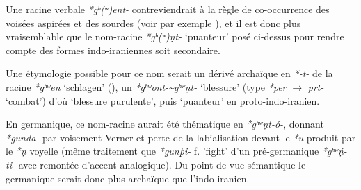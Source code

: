 \documentclass[11pt]{article}
\newcommand{\ipa}[1]{{\phon\textit{#1}}}
\begin{document}
Une racine verbale \ipa{*gʰ(ʷ)ent-} contreviendrait à la règle de co-occurrence des voisées aspirées et des sourdes (voir par exemple \citealt{kuemmel12pie}), et il est donc plus vraisemblable que le nom-racine \ipa{*gʰ(ʷ)ṇt-} `puanteur' posé ci-dessus pour rendre compte des formes indo-iraniennes soit secondaire.

Une étymologie possible pour ce nom serait un dérivé  archaïque en \ipa{*-t-} de la racine \ipa{*gʰʷen} `schlagen' (\citealt[218]{liv}), un \ipa{*gʰʷont-\textasciitilde *gʰʷṇt-} `blessure' (type \ipa{*per} $\rightarrow$ \ipa{pṛt-} `combat') d'où `blessure purulente', puis `puanteur' en proto-indo-iranien.

En germanique, ce nom-racine aurait été thématique en \ipa{*gʰʷṇt-ó-}, donnant \ipa{*gunda-} par voisement Verner et perte de la labialisation devant le \ipa{*u} produit par le \ipa{*ṇ} voyelle (même traitement que \ipa{*gunþi-} f. 'fight' d'un pré-germanique \ipa{*gʰʷṇ́-ti-} avec remontée d'accent analogique). Du point de vue sémantique le germanique serait donc plus archaïque que l'indo-iranien.




 
\end{document}
